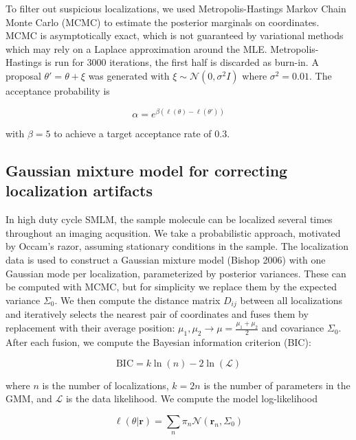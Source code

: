 \documentclass{ucetd}
\begin{document}
To filter out suspicious localizations, we used Metropolis-Hastings Markov Chain Monte Carlo (MCMC) to estimate the posterior marginals on coordinates. MCMC is asymptotically exact, which is not guaranteed by variational methods which may rely on a Laplace approximation around the MLE. Metropolis-Hastings is run for 3000 iterations, the first half is discarded as burn-in. A proposal $\theta' = \theta + \xi$ was generated with $\xi\sim \mathcal{N}(0,\sigma^{2}I)$ where $\sigma^{2}=0.01$. The acceptance probability is

\begin{equation*}
\alpha = e^{\beta(\ell(\theta)-\ell(\theta'))}
\end{equation*}

with $\beta=5$ to achieve a target acceptance rate of $0.3$. 

\subsection{Gaussian mixture model for correcting localization artifacts}

In high duty cycle SMLM, the sample molecule can be localized several times throughout an imaging acqusition. We take a probabilistic approach, motivated by Occam's razor, assuming stationary conditions in the sample. The localization data is used to construct a Gaussian mixture model (Bishop 2006) with one Gaussian mode per localization, parameterized by posterior variances. These can be computed with MCMC, but for simplicity we replace them by the expected variance $\Sigma_{0}$. We then compute the distance matrix $D_{ij}$ between all localizations and iteratively selects the nearest pair of coordinates and fuses them by replacement with their average position: $\mu_{1},\mu_{2}\rightarrow \mu=\frac{\mu_{1}+\mu_{2}}{2}$ and covariance $\Sigma_{0}$. After each fusion, we compute the Bayesian information criterion (BIC): 

\begin{equation*}
\mathrm{BIC} = k\ln(n) - 2\ln (\mathcal{L})
\end{equation*}

where $n$ is the number of localizations, $k=2n$ is the number of parameters in the GMM, and $\mathcal{L}$ is the data likelihood. We compute the model log-likelihood

\begin{equation*}
\ell(\theta|\bm{r}) = \sum_{n}\pi_{n}\mathcal{N}(\bm{r}_{n},\Sigma_{0})
\end{equation*}
\end{document}

